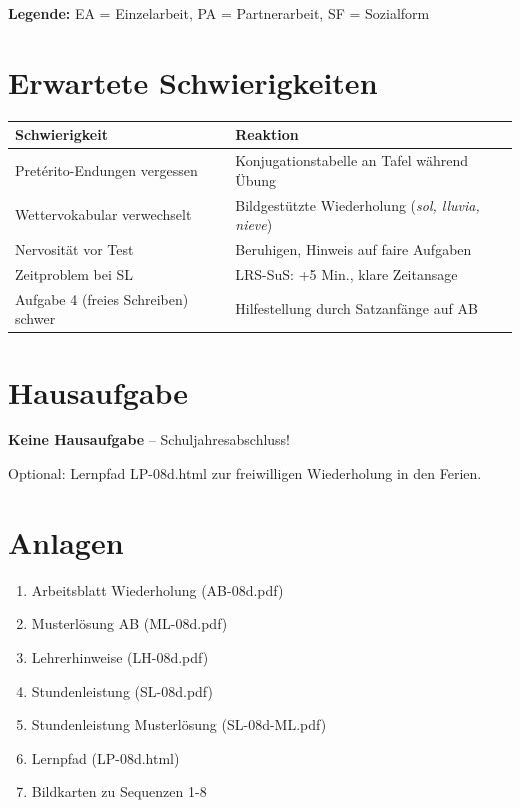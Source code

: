 \documentclass[11pt,a4paper]{article}
\begin{document}
\textbf{Legende:} EA = Einzelarbeit, PA = Partnerarbeit, SF = Sozialform

\section{Erwartete Schwierigkeiten}

\begin{tabular}{|p{5cm}|p{8cm}|}
\hline
\textbf{Schwierigkeit} & \textbf{Reaktion} \\
\hline
Pretérito-Endungen vergessen & Konjugationstabelle an Tafel während Übung \\
\hline
Wettervokabular verwechselt & Bildgestützte Wiederholung (\textit{sol, lluvia, nieve}) \\
\hline
Nervosität vor Test & Beruhigen, Hinweis auf faire Aufgaben \\
\hline
Zeitproblem bei SL & LRS-SuS: +5 Min., klare Zeitansage \\
\hline
Aufgabe 4 (freies Schreiben) schwer & Hilfestellung durch Satzanfänge auf AB \\
\hline
\end{tabular}

\section{Hausaufgabe}

\textbf{Keine Hausaufgabe} -- Schuljahresabschluss!

Optional: Lernpfad LP-08d.html zur freiwilligen Wiederholung in den Ferien.

\section{Anlagen}

\begin{enumerate}
    \item Arbeitsblatt Wiederholung (AB-08d.pdf)
    \item Musterlösung AB (ML-08d.pdf)
    \item Lehrerhinweise (LH-08d.pdf)
    \item Stundenleistung (SL-08d.pdf)
    \item Stundenleistung Musterlösung (SL-08d-ML.pdf)
    \item Lernpfad (LP-08d.html)
    \item Bildkarten zu Sequenzen 1-8
\end{enumerate}
\end{document}
